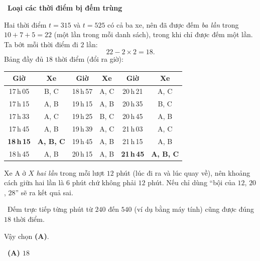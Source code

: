 \documentclass[11pt]{article}
\providecommand{\AnsWord}{Đáp số}
\newcommand{\ans}[1]{\par\smallskip{\bfseries\color{tmGreen!88!black}\AnsWord:}\ {\bfseries\color{AnsRed}#1}\par}
\newcommand{\step}[2]{\par\smallskip\noindent{\bfseries\color{tmBlue!85!black}\StepWord~#1.}\ {\bfseries #2}\par\nopagebreak}
\newcommand{\verify}[1]{\par\smallskip\noindent{\bfseries\color{tmGreen!80!black}\faCheckCircle\ \CheckWord}\ #1\par}
\def\AnsWord{Đáp số}
\def\StepWord{Bước}
\def\CheckWord{Thử lại:}
\begin{document}
{\step{5}{Loại các thời điểm bị đếm trùng}
Hai thời điểm $t=315$ và $t=525$ có cả ba xe, nên đã được đếm \emph{ba lần} trong $10+7+5=22$ (một lần trong mỗi danh sách), trong khi chỉ được đếm một lần. Ta bớt mỗi thời điểm đi $2$ lần:
\[ 22-2\times 2=18. \]
Bảng đầy đủ $18$ thời điểm (đổi ra giờ):
\begin{center}\small
\begin{tabular}{|c|c||c|c||c|c|}
\hline
\rowcolor{tmBlue!10}Giờ & Xe & Giờ & Xe & Giờ & Xe\\ \hline
17\,h\,05 & B, C & 18\,h\,57 & A, C & 20\,h\,21 & A, C\\ \hline
17\,h\,15 & A, B & 19\,h\,15 & A, B & 20\,h\,35 & B, C\\ \hline
17\,h\,33 & A, C & 19\,h\,25 & B, C & 20\,h\,45 & A, B\\ \hline
17\,h\,45 & A, B & 19\,h\,39 & A, C & 21\,h\,03 & A, C\\ \hline
\textbf{18\,h\,15} & \textbf{A, B, C} & 19\,h\,45 & A, B & 21\,h\,15 & A, B\\ \hline
18\,h\,45 & A, B & 20\,h\,15 & A, B & \textbf{21\,h\,45} & \textbf{A, B, C}\\ \hline
\end{tabular}
\end{center}
\begin{warnbox}Xe A ở $X$ \emph{hai lần} trong mỗi lượt $12$ phút (lúc đi ra và lúc quay về), nên khoảng cách giữa hai lần là $6$ phút chứ không phải $12$ phút. Nếu chỉ dùng ``bội của $12$, $20$, $28$'' sẽ ra kết quả sai.\end{warnbox}
\verify{Đếm trực tiếp từng phút từ $240$ đến $540$ (ví dụ bằng máy tính) cũng được đúng $18$ thời điểm.}
Vậy chọn \textbf{(A)}.
\ans{(A) $18$}
}
\end{document}
